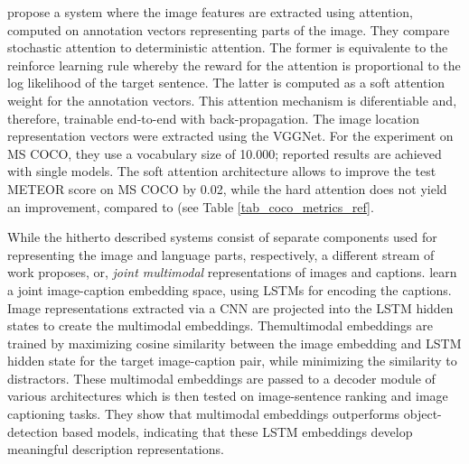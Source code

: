 \cite{xu2015show} propose a system where the image features are extracted using attention, computed on annotation vectors representing parts of the image. They compare stochastic attention to deterministic attention. The former is equivalente to the reinforce learning rule whereby the reward for the attention is proportional to the log likelihood of the target sentence. The latter is computed as a soft attention weight for the annotation vectors. This attention mechanism is diferentiable and, therefore, trainable end-to-end with back-propagation. The image location representation vectors were extracted using the VGGNet. For the experiment on MS COCO, they use a vocabulary size of 10.000; reported results are achieved with single models. The soft attention architecture allows to improve the test METEOR score on MS COCO by 0.02, while the hard attention does not yield an improvement, compared to \cite{vinyals2015show} (see Table \ref{tab_coco_metrics_ref}.

While the hitherto described systems consist of separate components used for representing the image and language parts, respectively, a different stream of work proposes, or, \textit{joint multimodal} representations of images and captions. \cite{kiros2014unifying} learn a joint image-caption embedding space, using LSTMs for encoding the captions. Image representations extracted via a CNN are projected into the LSTM hidden states to create the multimodal embeddings. Themultimodal embeddings are trained by maximizing cosine similarity between the image embedding and LSTM hidden state for the target image-caption pair, while minimizing the similarity to distractors. These multimodal embeddings are passed to a decoder module of various architectures which is then tested on image-sentence ranking and image captioning tasks. They show that multimodal embeddings outperforms object-detection based models, indicating that these LSTM embeddings develop meaningful description representations. 

